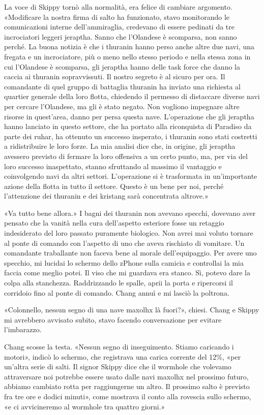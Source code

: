 La voce di Skippy tornò alla normalità, era felice di cambiare
argomento. «Modificare la nostra firma di salto ha funzionato, stavo
monitorando le comunicazioni interne dell'ammiraglia, credevano di
essere pedinati da tre incrociatori leggeri jeraptha. Sanno che
l'Olandese è scomparsa, non sanno perché. La buona notizia è che i
thuranin hanno perso anche altre due navi, una fregata e un
incrociatore, più o meno nello stesso periodo e nella stessa zona in cui
l'Olandese è scomparsa, gli jeraptha hanno delle task force che danno la
caccia ai thuranin sopravvissuti. Il nostro segreto è al sicuro per ora.
Il comandante di quel gruppo di battaglia thuranin ha inviato una
richiesta al quartier generale della loro flotta, chiedendo il permesso
di distaccare diverse navi per cercare l'Olandese, ma gli è stato
negato. Non vogliono impegnare altre risorse in quest'area, danno per
persa questa nave. L'operazione che gli jeraptha hanno lanciato in
questo settore, che ha portato alla riconquista di Paradiso da parte dei
ruhar, ha ottenuto un successo insperato, i thuranin sono stati
costretti a ridistribuire le loro forze. La mia analisi dice che, in
origine, gli jeraptha avessero previsto di fermare la loro offensiva a
un certo punto, ma, per via del loro successo inaspettato, stanno
sfruttando al massimo il vantaggio e coinvolgendo navi da altri settori.
L'operazione si è trasformata in un'importante azione della flotta in
tutto il settore. Questo è un bene per noi, perché l'attenzione dei
thuranin e dei kristang sarà concentrata altrove.»

«Va tutto bene allora.» I bagni dei thuranin non avevano specchi,
dovevano aver pensato che la vanità nella cura dell'aspetto esteriore
fosse un retaggio indesiderato del loro passato puramente biologico. Non
avrei mai voluto tornare al ponte di comando con l'aspetto di uno che
aveva rischiato di vomitare. Un comandante traballante non faceva bene
al morale dell'equipaggio. Per avere uno specchio, mi lucidai lo schermo
dello zPhone sulla camicia e controllai la mia faccia come meglio potei.
Il viso che mi guardava era stanco. Sì, potevo dare la colpa alla
stanchezza. Raddrizzando le spalle, aprii la porta e ripercorsi il
corridoio fino al ponte di comando. Chang annuì e mi lasciò la poltrona.

«Colonnello, nessun segno di una nave maxolhx là fuori?», chiesi. Chang
e Skippy mi avrebbero avvisato subito, stavo facendo conversazione per
evitare l'imbarazzo.

Chang scosse la testa. «Nessun segno di inseguimento. Stiamo caricando i
motori», indicò lo schermo, che registrava una carica corrente del 12\%,
«per un'altra serie di salti. Il signor Skippy dice che il wormhole che
volevamo attraversare noi potrebbe essere usato dalle navi maxolhx nel
prossimo futuro, abbiamo cambiato rotta per raggiungerne un altro. Il
prossimo salto è previsto fra tre ore e dodici minuti», come mostrava il
conto alla rovescia sullo schermo, «e ci avvicineremo al wormhole tra
quattro giorni.»

